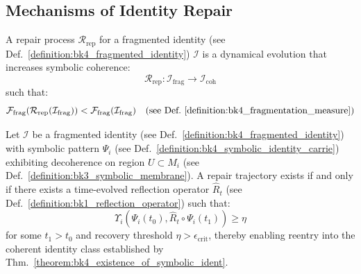\subsection{Mechanisms of Identity Repair} \label{subsec:bk4_mechanisms_identity_repair}
\begin{definition} \label{definition:bk4_repair_process}
A repair process $\mathcal{R}_{\text{rep}}$ for a fragmented identity (see Def.~\ref{definition:bk4_fragmented_identity}) $\mathcal{I}$ is a dynamical evolution that increases symbolic coherence:
\begin{equation}
    \mathcal{R}_{\text{rep}}: \mathcal{I}_{\text{frag}} \to \mathcal{I}_{\text{coh}}
\end{equation}
such that:
\begin{equation}
    \mathcal{F}_{\text{frag}}(\mathcal{R}_{\text{rep}}(\mathcal{I}_{\text{frag}})) < \mathcal{F}_{\text{frag}}(\mathcal{I}_{\text{frag}}) \quad \text{(see Def.~\ref{definition:bk4_fragmentation_measure})}
\end{equation}
\end{definition}
\begin{theorem} \label{theorem:bk4_reflective_reentry}
Let $\mathcal{I}$ be a fragmented identity (see Def.~\ref{definition:bk4_fragmented_identity}) with symbolic pattern $\Psi_i$ 
(see Def.~\ref{definition:bk4_symbolic_identity_carrie}) exhibiting decoherence on region $U \subset M_i$ (see Def.~\ref{definition:bk3_symbolic_membrane}). 
A repair trajectory exists if and only if there exists a time-evolved reflection operator $\widehat{R}_t$ (see Def.~\ref{definition:bk1_reflection_operator}) such that:
\begin{equation}
    \Upsilon_i(\Psi_i(t_0), \widehat{R}_t \circ \Psi_i(t_1)) \geq \eta
\end{equation}
for some $t_1 > t_0$ and recovery threshold $\eta > \epsilon_{\text{crit}}$, thereby enabling reentry into the coherent identity class established by Thm.~\ref{theorem:bk4_existence_of_symbolic_ident}.
\end{theorem}
